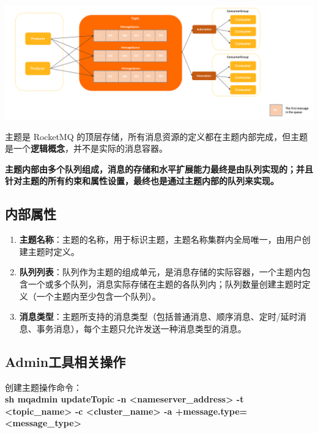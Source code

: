 \documentclass[11pt, a4paper, oneside, fontset=none]{ctexbook}
\begin{document}
\begin{center}
  \begin{minipage}{\textwidth}
    \center
    \includegraphics[width=\textwidth]{picture/模型关系：主题}
    \captionsetup{hypcap=false}
    \label{fig:模型关系：主题}
  \end{minipage}
\end{center}

主题是 RocketMQ 的顶层存储，所有消息资源的定义都在主题内部完成，但主题是一个{\bfseries\kaishu 逻辑概念}，并不是实际的消息容器。

\textbf{主题内部由多个队列组成，消息的存储和水平扩展能力最终是由队列实现的；并且针对主题的所有约束和属性设置，最终也是通过主题内部的队列来实现。}

\subsection{内部属性}
\begin{enumerate}
  \item \textbf{主题名称}：主题的名称，用于标识主题，主题名称集群内全局唯一，由用户创建主题时定义。
  \item \textbf{队列列表}：队列作为主题的组成单元，是消息存储的实际容器，一个主题内包含一个或多个队列，消息实际存储在主题的各队列内；队列数量创建主题时定义（一个主题内至少包含一个队列）。
  \item \textbf{消息类型}：主题所支持的消息类型（包括普通消息、顺序消息、定时/延时消息、事务消息），每个主题只允许发送一种消息类型的消息。
\end{enumerate}

\subsection{Admin工具相关操作}
创建主题操作命令：\\
\textbf{sh mqadmin updateTopic -n <nameserver\_address> -t <topic\_name> -c <cluster\_name> -a +message.type=<message\_type>}
\end{document}
